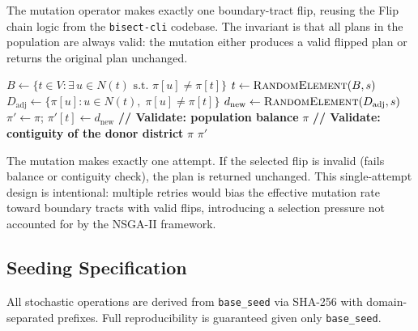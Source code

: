 The mutation operator makes exactly one boundary-tract flip, reusing the
Flip chain logic from the \texttt{bisect-cli} codebase.
The invariant is that all plans in the population are always valid: the
mutation either produces a valid flipped plan or returns the original
plan unchanged.

\begin{algorithm}[t]
\caption{\textsc{Mutate}($\pi$, $G$, $\mathbf{p}$, $\varepsilon_{\mathrm{bal}}$, $s$)}
\label{alg:mutate}
\begin{algorithmic}[1]
\State $B \gets \{t \in V : \exists\, u \in N(t) \text{ s.t.\ } \pi[u] \neq \pi[t]\}$
\State $t \gets \textsc{RandomElement}(B, s)$
\State $D_{\mathrm{adj}} \gets \{\pi[u] : u \in N(t),\; \pi[u] \neq \pi[t]\}$
\State $d_{\mathrm{new}} \gets \textsc{RandomElement}(D_{\mathrm{adj}}, s)$
\State $\pi' \gets \pi$; \quad $\pi'[t] \gets d_{\mathrm{new}}$
\State \textbf{// Validate: population balance}
  \State \Return $\pi$
\EndIf
\State \textbf{// Validate: contiguity of the donor district}
  \State \Return $\pi$
\EndIf
\State \Return $\pi'$
\end{algorithmic}
\end{algorithm}

The mutation makes exactly one attempt.
If the selected flip is invalid (fails balance or contiguity check), the
plan is returned unchanged.
This single-attempt design is intentional: multiple retries would bias
the effective mutation rate toward boundary tracts with valid flips,
introducing a selection pressure not accounted for by the NSGA-II framework.

\subsection{Seeding Specification}

All stochastic operations are derived from \texttt{base\_seed} via SHA-256
with domain-separated prefixes.
Full reproducibility is guaranteed given only \texttt{base\_seed}.

